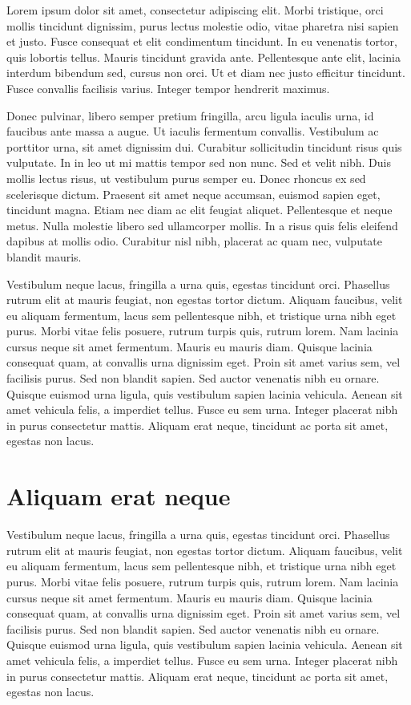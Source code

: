 
\label{Cap:Problema}
Lorem ipsum dolor sit amet, consectetur adipiscing elit. Morbi tristique, orci mollis tincidunt dignissim, purus lectus molestie odio, vitae pharetra nisi sapien et justo. Fusce consequat et elit condimentum tincidunt. In eu venenatis tortor, quis lobortis tellus. Mauris tincidunt gravida ante. Pellentesque ante elit, lacinia interdum bibendum sed, cursus non orci. Ut et diam nec justo efficitur tincidunt. Fusce convallis facilisis varius. Integer tempor hendrerit maximus.

Donec pulvinar, libero semper pretium fringilla, arcu ligula iaculis urna, id faucibus ante massa a augue. Ut iaculis fermentum convallis. Vestibulum ac porttitor urna, sit amet dignissim dui. Curabitur sollicitudin tincidunt risus quis vulputate. In in leo ut mi mattis tempor sed non nunc. Sed et velit nibh. Duis mollis lectus risus, ut vestibulum purus semper eu. Donec rhoncus ex sed scelerisque dictum. Praesent sit amet neque accumsan, euismod sapien eget, tincidunt magna. Etiam nec diam ac elit feugiat aliquet. Pellentesque et neque metus. Nulla molestie libero sed ullamcorper mollis. In a risus quis felis eleifend dapibus at mollis odio. Curabitur nisl nibh, placerat ac quam nec, vulputate blandit mauris.

Vestibulum neque lacus, fringilla a urna quis, egestas tincidunt orci. Phasellus rutrum elit at mauris feugiat, non egestas tortor dictum. Aliquam faucibus, velit eu aliquam fermentum, lacus sem pellentesque nibh, et tristique urna nibh eget purus. Morbi vitae felis posuere, rutrum turpis quis, rutrum lorem. Nam lacinia cursus neque sit amet fermentum. Mauris eu mauris diam. Quisque lacinia consequat quam, at convallis urna dignissim eget. Proin sit amet varius sem, vel facilisis purus. Sed non blandit sapien. Sed auctor venenatis nibh eu ornare. Quisque euismod urna ligula, quis vestibulum sapien lacinia vehicula. Aenean sit amet vehicula felis, a imperdiet tellus. Fusce eu sem urna. Integer placerat nibh in purus consectetur mattis. Aliquam erat neque, tincidunt ac porta sit amet, egestas non lacus.

\section{Aliquam erat neque}
\label{Sec:flutuantes}

Vestibulum neque lacus, fringilla a urna quis, egestas tincidunt orci. Phasellus rutrum elit at mauris feugiat, non egestas tortor dictum. Aliquam faucibus, velit eu aliquam fermentum, lacus sem pellentesque nibh, et tristique urna nibh eget purus. Morbi vitae felis posuere, rutrum turpis quis, rutrum lorem. Nam lacinia cursus neque sit amet fermentum. Mauris eu mauris diam. Quisque lacinia consequat quam, at convallis urna dignissim eget. Proin sit amet varius sem, vel facilisis purus. Sed non blandit sapien. Sed auctor venenatis nibh eu ornare. Quisque euismod urna ligula, quis vestibulum sapien lacinia vehicula. Aenean sit amet vehicula felis, a imperdiet tellus. Fusce eu sem urna. Integer placerat nibh in purus consectetur mattis. Aliquam erat neque, tincidunt ac porta sit amet, egestas non lacus.


